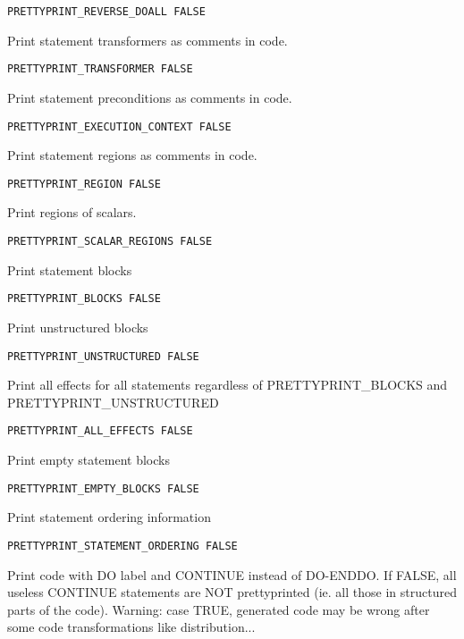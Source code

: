\begin{verbatim}
PRETTYPRINT_REVERSE_DOALL FALSE
\end{verbatim}

Print statement transformers as comments in code.

\begin{verbatim}
PRETTYPRINT_TRANSFORMER FALSE
\end{verbatim}

Print statement preconditions as comments in code.

\begin{verbatim}
PRETTYPRINT_EXECUTION_CONTEXT FALSE
\end{verbatim}

Print statement regions as comments in code.

\begin{verbatim}
PRETTYPRINT_REGION FALSE
\end{verbatim}

Print regions of scalars.

\begin{verbatim}
PRETTYPRINT_SCALAR_REGIONS FALSE
\end{verbatim}

Print statement blocks

\begin{verbatim}
PRETTYPRINT_BLOCKS FALSE
\end{verbatim}

Print unstructured blocks

\begin{verbatim}
PRETTYPRINT_UNSTRUCTURED FALSE
\end{verbatim}

Print all effects for all statements regardless of PRETTYPRINT\_BLOCKS
and PRETTYPRINT\_UNSTRUCTURED

\begin{verbatim}
PRETTYPRINT_ALL_EFFECTS FALSE
\end{verbatim}

Print empty statement blocks

\begin{verbatim}
PRETTYPRINT_EMPTY_BLOCKS FALSE
\end{verbatim}

Print statement ordering information

\begin{verbatim}
PRETTYPRINT_STATEMENT_ORDERING FALSE
\end{verbatim}

Print code with DO label and CONTINUE instead of DO-ENDDO. If FALSE, all
useless CONTINUE statements are NOT prettyprinted (ie. all those in
structured parts of the code). Warning: case TRUE, generated code may be
wrong after some code transformations like distribution...


